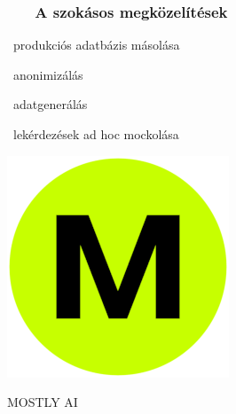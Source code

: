 \documentclass[
    aspectratio=169,
]{beamer}
\newcommand{\slidetitle}[2]{\frametitle{{\small #1 ~ \ding{226} ~ } \normalsize \textbf{#2} }}
\begin{document}
\begin{frame}[fragile]
    \slidetitle{\sectionshorttitle}{A szokásos megközelítések}
    
    \begin{minipage}[c]{0.63\textwidth}
        \begin{logolist}
            \setlength\itemsep{2em}
            \Large
            \item[\raisebox{-0.4em}{}]
                    ~produkciós adatbázis másolása
            \item[\raisebox{-0.4em}{}]
                    ~anonimizálás
            \item[\raisebox{-0.4em}{}]
                    ~adatgenerálás
            \item[\raisebox{-0.4em}{}]
                    ~lekérdezések ad hoc mockolása
        \end{logolist}
        \pause
    \end{minipage}%
    \hspace*{\fill}%
    \begin{minipage}[c]{0.35\textwidth}
        \centering
        
        \begin{minipage}[t]{0.48\textwidth}
            \includegraphics[width=0.7\linewidth, frame]{image/mostly-ai}\par
            MOSTLY AI
            

\end{minipage}
\end{minipage}
\end{frame}
\end{document}
